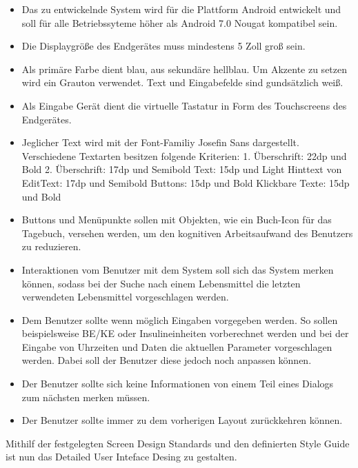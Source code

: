 \begin{itemize}
	\item Das zu entwickelnde System wird für die Plattform Android entwickelt und soll für alle Betriebssyteme höher als Android 7.0 Nougat kompatibel sein.
	\item Die Displaygröße des Endgerätes muss mindestens 5 Zoll groß sein.
	\item Als primäre Farbe dient blau, aus sekundäre hellblau. Um Akzente zu setzen wird ein Grauton verwendet. Text und Eingabefelde sind gundsätzlich weiß.
	\item Als Eingabe Gerät dient die virtuelle Tastatur in Form des Touchscreens des Endgerätes.
	\item Jeglicher Text wird mit der Font-Familiy Josefin Sans dargestellt. Verschiedene Textarten besitzen folgende Kriterien:\newline
	\noindent\hspace*{10mm}1. Überschrift: 22dp und Bold\newline 
	\noindent\hspace*{10mm}2. Überschrift: 17dp und Semibold\newline 
	\noindent\hspace*{10mm}Text: 15dp und Light\newline
	\noindent\hspace*{10mm}Hinttext von EditText: 17dp und Semibold\newline
	\noindent\hspace*{10mm}Buttons: 15dp und Bold\newline   
	\noindent\hspace*{10mm}Klickbare Texte: 15dp und Bold 
	\item Buttons und Menüpunkte sollen mit Objekten, wie ein Buch-Icon für das Tagebuch, versehen werden, um den kognitiven Arbeitsaufwand des Benutzers zu reduzieren.
	\item Interaktionen vom Benutzer mit dem System soll sich das System merken können, sodass bei der Suche nach einem Lebensmittel die letzten verwendeten Lebensmittel vorgeschlagen werden.
	\item Dem Benutzer sollte wenn möglich Eingaben vorgegeben werden. So sollen beispielsweise BE/KE oder Insulineinheiten vorberechnet werden und bei der Eingabe von Uhrzeiten und Daten die aktuellen Parameter vorgeschlagen werden. Dabei soll der Benutzer diese jedoch noch anpassen können.
	\item Der Benutzer sollte sich keine Informationen von einem Teil eines Dialogs zum nächsten merken müssen.
	\item Der Benutzer sollte immer zu dem vorherigen Layout zurückkehren können.
\end{itemize}
Mithilf der festgelegten Screen Design Standards und den definierten Style Guide ist nun das Detailed User Inteface Desing zu gestalten.
